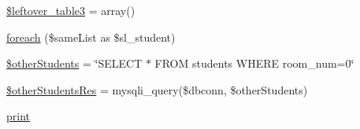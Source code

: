 \begin{DoxyCompactItemize}
\item 
\hyperlink{autoStudent_8php_a35b65b2170992bf2380327e701448d3d}{\$leftover\-\_\-table3} = array()
\item 
\hyperlink{autoStudent_8php_ae984c01f36faa31c40889b54bab3cc5f}{foreach} (\$same\-List as \$sl\-\_\-student)
\item 
\hyperlink{autoStudent_8php_a5ecf40283519ca1d11b92be0685c64a6}{\$other\-Students} = \char`\"{}\-S\-E\-L\-E\-C\-T $\ast$ \-F\-R\-O\-M students \-W\-H\-E\-R\-E room\-\_\-num=0\char`\"{}
\item 
\hyperlink{autoStudent_8php_a95f5d9e24eab0566eee61e4cc48e9028}{\$other\-Students\-Res} = mysqli\-\_\-query(\$dbconn, \$other\-Students)
\item 
\hyperlink{autoStudent_8php_a3ad3a4240c0f97c7e85aff5c52a454d4}{print}
\end{DoxyCompactItemize}


